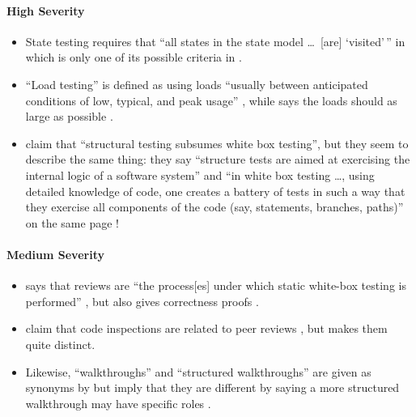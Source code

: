 \paragraph{High Severity}
\begin{itemize}
    \item State testing requires that ``all states in the state model
          \dots\ [are] `visited'\,'' in \citep[p.~19]{IEEE2021} which
          is only one of its possible criteria in \citep[pp.~82-83]{Patton2006}.
    \item ``Load testing'' is defined as using loads ``usually between
          anticipated conditions of low, typical, and peak usage''
          \citep[p.~5]{IEEE2022}, while \citeauthor{Patton2006} says the
          loads should as large as possible \citeyearpar[p.~86]{Patton2006}.
    \item \citeauthor{PetersAndPedrycz2000} claim that ``structural testing
          subsumes white box testing'', but they seem to describe the same
          thing: they say ``structure tests are aimed at exercising the
          internal logic of a software system'' and ``in white box testing
          \dots, using detailed knowledge of code, one creates a battery of
          tests in such a way that they exercise all components of the code
          (say, statements, branches, paths)'' on the same page
          \citeyearpar[p.~447]{PetersAndPedrycz2000}!
\end{itemize}

\paragraph{Medium Severity}
\begin{itemize}
    \item \citeauthor{Patton2006} says that reviews are ``the process[es] under
          which static white-box testing is performed''
          \citeyearpar[p.~92]{Patton2006}, but \citeauthor{vanVliet2000}
          also gives correctness proofs \citeyearpar[pp.~418-419]{vanVliet2000}.
    \item \citeauthor{ISTQB_author} claim that code inspections are
          related to peer reviews \citeyearpar{ISTQB}, but
          \citet[pp.~94-95]{Patton2006} makes them quite distinct.
    \item Likewise, ``walkthroughs'' and ``structured walkthroughs''
          are given as synonyms by \citetISTQB{} but
          \citeauthor{PetersAndPedrycz2000} imply that they are
          different by saying a more structured walkthrough may have
          specific roles \citeyearpar[p.~484]{PetersAndPedrycz2000}.
\end{itemize}

